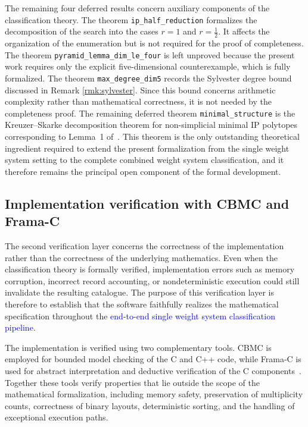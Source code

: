 \documentclass[appliedmath,article,submit,moreauthors]{Definitions/mdpi}
\begin{document}
The remaining four deferred results concern auxiliary components of the
classification theory. The theorem \nolinkurl{ip\_half\_reduction} formalizes
the decomposition of the search into the cases \(r=1\) and \(r=\frac12\). It
affects the organization of the enumeration but is not required for the proof of
completeness. The theorem \nolinkurl{pyramid\_lemma\_dim\_le\_four} is left
unproved because the present work requires only the explicit five-dimensional
counterexample, which is fully formalized. The theorem
\nolinkurl{max\_degree\_dim5} records the Sylvester degree bound discussed in
Remark \ref{rmk:sylvester}. Since this bound concerns arithmetic complexity rather
than mathematical correctness, it is not needed by the completeness proof. The
remaining deferred theorem \nolinkurl{minimal\_structure} is the Kreuzer--Skarke
decomposition theorem for non-simplicial minimal IP polytopes corresponding to
Lemma~1 of~\cite{KS97}. This theorem is the only outstanding theoretical
ingredient required to extend the present formalization from the
single weight system setting to the complete combined weight system
classification, and it therefore remains the principal open component of the
formal development.

\subsection{Implementation verification with CBMC and Frama-C}
\label{sec:verification-impl}

The second verification layer concerns the correctness of the implementation
rather than the correctness of the underlying mathematics. Even when the
classification theory is formally verified, implementation errors such as memory
corruption, incorrect record accounting, or nondeterministic execution could
still invalidate the resulting catalogue. The purpose of this verification layer
is therefore to establish that the software faithfully realizes the mathematical
specification throughout the \textcolor{blue}{end-to-end
single weight system classification pipeline}.

The implementation is verified using two complementary tools. CBMC is employed
for bounded model checking of the C and C++ code, while Frama-C is used for
abstract interpretation and deductive verification of the C
components~\cite{CBMC,FramaC}. Together these tools verify properties that lie
outside the scope of the mathematical formalization, including memory safety,
preservation of multiplicity counts, correctness of binary layouts,
deterministic sorting, and the handling of exceptional execution paths.
\end{document}
